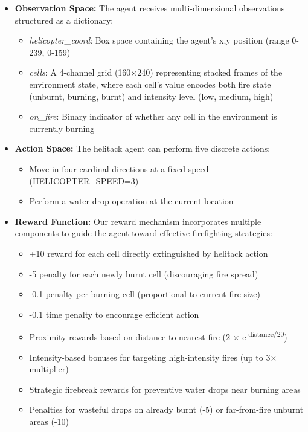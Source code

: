 \documentclass[conference]{IEEEtran}
\begin{document}
\begin{itemize}
    \item \textbf{Observation Space:} The agent receives multi-dimensional observations structured as a dictionary:
    \begin{itemize}
        \item \textit{helicopter\_coord}: Box space containing the agent's x,y position (range 0-239, 0-159)
        \item \textit{cells}: A 4-channel grid (160×240) representing stacked frames of the environment state, where each cell's value encodes both fire state (unburnt, burning, burnt) and intensity level (low, medium, high)
        \item \textit{on\_fire}: Binary indicator of whether any cell in the environment is currently burning
    \end{itemize}
    
    \item \textbf{Action Space:} The helitack agent can perform five discrete actions:
    \begin{itemize}
        \item Move in four cardinal directions at a fixed speed (HELICOPTER\_SPEED=3)
        \item Perform a water drop operation at the current location
    \end{itemize}
    
    \item \textbf{Reward Function:} Our reward mechanism incorporates multiple components to guide the agent toward effective firefighting strategies:
    \begin{itemize}
        \item +10 reward for each cell directly extinguished by helitack action
        \item -5 penalty for each newly burnt cell (discouraging fire spread)
        \item -0.1 penalty per burning cell (proportional to current fire size)
        \item -0.1 time penalty to encourage efficient action
        \item Proximity rewards based on distance to nearest fire (2 × e\textsuperscript{-distance/20})
        \item Intensity-based bonuses for targeting high-intensity fires (up to 3× multiplier)
        \item Strategic firebreak rewards for preventive water drops near burning areas
        \item Penalties for wasteful drops on already burnt (-5) or far-from-fire unburnt areas (-10)
    \end{itemize}


\end{itemize}
\end{document}
